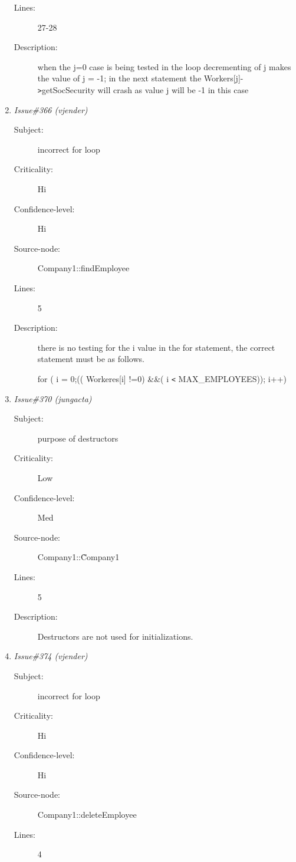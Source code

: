\begin{enumerate}
\begin{description}
\item [Lines:] 27-28

\item [Description:] when the j=0 case is being tested in the loop
 decrementing of j makes the value of j = -1; in the next
 statement the Workers[j]-{\tt >}getSocSecurity will crash as
 value j will be -1 in this case
\end{description}
\item {\it Issue\#366 (vjender)}
\begin{description}
\item [Subject:] incorrect  for loop
\item [Criticality:] Hi
\item [Confidence-level:] Hi
\item [Source-node:] Company1::findEmployee

\item [Lines:] 5

\item [Description:] there  is no testing for the i value in the
for statement, the correct statement must be as follows.

for ( i = 0;(( Workeres[i] !=0) \&\&( i {\tt <} MAX\_EMPLOYEES)); i++)
\end{description}
\item {\it Issue\#370 (jungacta)}
\begin{description}
\item [Subject:] purpose of destructors
\item [Criticality:] Low
\item [Confidence-level:] Med
\item [Source-node:] Company1::\~Company1

\item [Lines:] 5

\item [Description:] Destructors are not used for initializations.
\end{description}
\item {\it Issue\#374 (vjender)}
\begin{description}
\item [Subject:] incorrect for loop
\item [Criticality:] Hi
\item [Confidence-level:] Hi
\item [Source-node:] Company1::deleteEmployee

\item [Lines:] 4


\end{description}
\end{enumerate}

